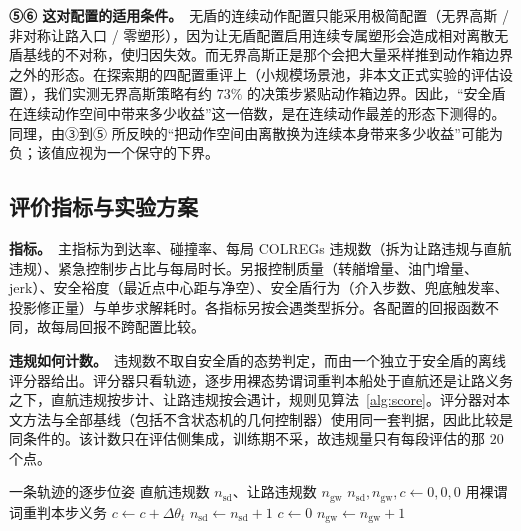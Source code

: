\documentclass[12pt,letterpaper]{article}
\begin{document}
\textbf{⑤⑥ 这对配置的适用条件。}\ 无盾的连续动作配置只能采用极简配置（无界高斯 / 非对称让路入口 / 零塑形），因为让无盾配置启用连续专属塑形会造成相对离散无盾基线的不对称，使归因失效。而无界高斯正是那个会把大量采样推到动作箱边界之外的形态。在探索期的四配置重评上（小规模场景池，非本文正式实验的评估设置），我们实测无界高斯策略有约 $73\%$ 的决策步紧贴动作箱边界。因此，“安全盾在连续动作空间中带来多少收益”这一倍数，是在连续动作最差的形态下测得的。同理，由③到⑤ 所反映的“把动作空间由离散换为连续本身带来多少收益”可能为负；该值应视为一个保守的下界。

\subsection{评价指标与实验方案}
\label{sec:metrics}

\textbf{指标。}\ 主指标为到达率、碰撞率、每局 COLREGs 违规数（拆为让路违规与直航违规）、紧急控制步占比与每局时长。另报控制质量（转艏增量、油门增量、jerk）、安全裕度（最近点中心距与净空）、安全盾行为（介入步数、兜底触发率、投影修正量）与单步求解耗时。各指标另按会遇类型拆分。各配置的回报函数不同，故每局回报不跨配置比较。

\textbf{违规如何计数。}\ 违规数不取自安全盾的态势判定，而由一个独立于安全盾的离线评分器给出。评分器只看轨迹，逐步用裸态势谓词重判本船处于直航还是让路义务之下，直航违规按步计、让路违规按会遇计，规则见算法~\ref{alg:score}。评分器对本文方法与全部基线（包括不含状态机的几何控制器）使用同一套判据，因此比较是同条件的。该计数只在评估侧集成，训练期不采，故违规量只有每段评估的那 $20$ 个点。

\begin{algorithm}[htbp]
\caption{离线评分器的违规计数}
\label{alg:score}
\small
\begin{algorithmic}[1]
\Require 一条轨迹的逐步位姿
\Ensure 直航违规数 $n_{\mathrm{sd}}$、让路违规数 $n_{\mathrm{gw}}$
\State $n_{\mathrm{sd}},n_{\mathrm{gw}},c \gets 0,0,0$
  \State 用裸谓词重判本步义务
    \State $c \gets c+\Delta\theta_t$
     \State $n_{\mathrm{sd}} \gets n_{\mathrm{sd}}+1$ \EndIf
   \State $c \gets 0$
  \EndIf
\EndFor
{}
    \State $n_{\mathrm{gw}} \gets n_{\mathrm{gw}}+1$
  \EndIf
\EndFor
\end{algorithmic}
\end{algorithm}
\end{document}
